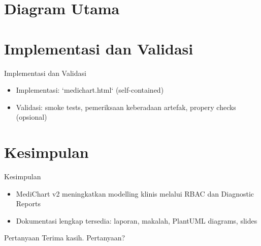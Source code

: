\documentclass{beamer}
\begin{document}
\section{Diagram Utama}

\section{Implementasi dan Validasi}
\begin{frame}{Implementasi dan Validasi}
  \begin{itemize}
    \item Implementasi: `medichart.html` (self-contained)
    \item Validasi: smoke tests, pemeriksaan keberadaan artefak, propery checks (opsional)
  \end{itemize}
\end{frame}

\section{Kesimpulan}
\begin{frame}{Kesimpulan}
  \begin{itemize}
    \item MediChart v2 meningkatkan modelling klinis melalui RBAC dan Diagnostic Reports
    \item Dokumentasi lengkap tersedia: laporan, makalah, PlantUML diagrams, slides
  \end{itemize}
\end{frame}

\begin{frame}{Pertanyaan}
  \centering Terima kasih. Pertanyaan?
\end{frame}
\end{document}
